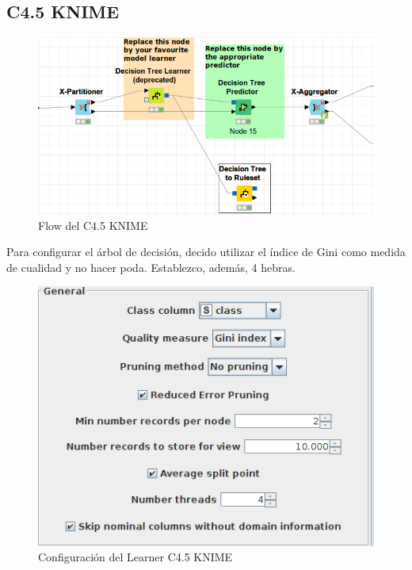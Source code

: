 \subsection{C4.5 KNIME}

\begin{figure}[H] %
	\centering
	\includegraphics[scale=0.5]{flow-c45-p.png}  %
	\caption{Flow del C4.5 KNIME} 
	\label{fig:flowc4.5}
\end{figure}



Para configurar el árbol de decisión, decido utilizar el índice de Gini como medida de cualidad y no hacer poda. Establezco, además, 4 hebras.

\begin{figure}[H] %
	\centering
	\includegraphics[scale=0.5]{confc45-p.png}  %
	\caption{Configuración del Learner C4.5 KNIME} 
	\label{fig:confc45-p}
\end{figure}

